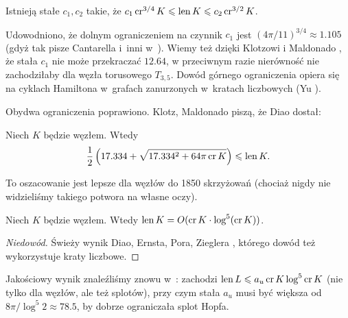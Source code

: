 \begin{proposition}
    Istnieją stałe $c_1, c_2$ takie, że $c_1 \operatorname{cr}^{3/4} K \leqslant \operatorname{len} K \leqslant c_2 \operatorname{cr}^{3/2} K$.
\end{proposition}

Udowodniono, że dolnym ograniczeniem na czynnik $c_1$ jest $(4\pi/11)^{3/4} \approx 1.105$ (gdyż tak pisze Cantarella i~inni w~\cite[tw. 23]{cantarella2002}).
Wiemy też dzięki Klotzowi i Maldonado \cite{klotz2021}, że stała $c_1$ nie może przekraczać $12.64$, w przeciwnym razie nierówność nie zachodziłaby dla węzła torusowego $T_{3,5}$.
%
%
Dowód górnego ograniczenia opiera się na cyklach Hamiltona w~grafach zanurzonych w~kratach liczbowych (Yu \cite{yu2004}).

Obydwa ograniczenia poprawiono.
Klotz, Maldonado \cite{klotz2021} piszą, że Diao dostał:

\begin{proposition}
    Niech $K$ będzie węzłem.
    Wtedy
    \begin{equation}
        \frac 12 \left(17.334 + \sqrt{17.334^2 + 64 \pi \operatorname{cr} K}\right) \leqslant \operatorname{len} K.
    \end{equation}
\end{proposition}

To oszacowanie jest lepsze dla węzłów do 1850 skrzyżowań (chociaż nigdy nie widzieliśmy takiego potwora na własne oczy).


\begin{proposition}
    Niech $K$ będzie węzłem.
    Wtedy $\operatorname{len} K = O(\operatorname{cr} K \cdot \log^5(\operatorname{cr} K))$.
\end{proposition}

\begin{proof}[Niedowód]
    Świeży wynik Diao, Ernsta, Pora, Zieglera \cite{diao2019}, którego dowód też wykorzystuje kraty liczbowe.
\end{proof}

Jakościowy wynik znaleźliśmy znowu w~\cite{klotz2021}: zachodzi $\operatorname{len} L \leqslant a_u \operatorname{cr} K \log^5 \operatorname{cr} K$ (nie tylko dla węzłów, ale też splotów), przy czym stała $a_u$ musi być większa od $8\pi/\log^5 2 \approx 78.5$, by dobrze ograniczała splot Hopfa.

